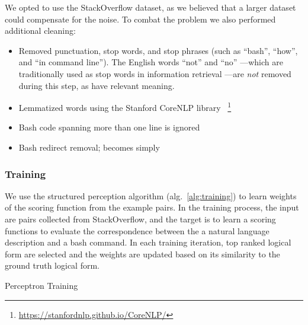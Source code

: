 We opted to use the StackOverflow dataset, as we believed that a larger dataset
could compensate for the noise. To combat the problem we also performed
additional cleaning:
\begin{itemize}
	\item Removed punctuation, stop words, and stop phrases (such as ``bash'',
		``how'', and ``in command line''). The English words ``not'' and ``no''%
		---which are traditionally used as stop words in information retrieval%
		---are \emph{not} removed during this step, as have relevant meaning.
	\item Lemmatized words using the Stanford CoreNLP library~%
		\footnote{\url{https://stanfordnlp.github.io/CoreNLP/}}
	\item Bash code spanning more than one line is ignored
	\item Bash redirect removal;  becomes simply 
\end{itemize}

\subsubsection{Training}
\label{subsec:training}

We use the structured perception algorithm (alg.~\ref{alg:training}) to learn weights of the scoring function from the example pairs. In the training process, the input are pairs collected from StackOverflow, and the target is to learn a scoring functions to evaluate the correspondence between the a natural language description and a bash command. In each training iteration, top ranked logical form are selected and the weights are updated based on its similarity to the ground truth logical form.

\begin{algorithm}
\caption{Perceptron Training\label{alg:training}}
\end{algorithm}
